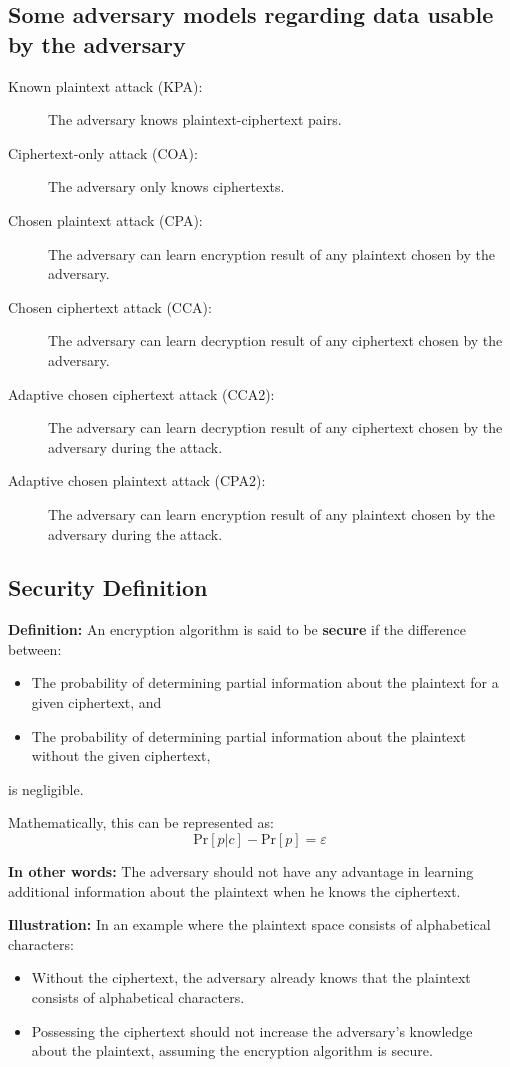 \documentclass[12pt]{article}
\begin{document}
\subsection*{Some adversary models regarding data usable by the adversary}
\begin{description}
    \item[Known plaintext attack (KPA):] The adversary knows plaintext-ciphertext pairs.
    \item[Ciphertext-only attack (COA):] The adversary only knows ciphertexts.
    \item[Chosen plaintext attack (CPA):] The adversary can learn encryption result of any plaintext chosen by the adversary.
    \item[Chosen ciphertext attack (CCA):] The adversary can learn decryption result of any ciphertext chosen by the adversary.
    \item[Adaptive chosen ciphertext attack (CCA2):] The adversary can learn decryption result of any ciphertext chosen by the adversary during the attack.
    \item[Adaptive chosen plaintext attack (CPA2):] The adversary can learn encryption result of any plaintext chosen by the adversary during the attack.     
\end{description}


\subsection*{Security Definition}

\noindent\textbf{Definition:}
An encryption algorithm is said to be \textbf{secure} if the difference between:
\begin{itemize}
    \item The probability of determining partial information about the plaintext for a given ciphertext, and
    \item The probability of determining partial information about the plaintext without the given ciphertext,
\end{itemize}
is negligible.

\noindent Mathematically, this can be represented as:
\[ \text{Pr} [p|c] - \text{Pr}[p] = \varepsilon \]

\noindent\textbf{In other words:}
The adversary should not have any advantage in learning additional information about the plaintext when he knows the ciphertext.

\noindent\textbf{Illustration:}
In an example where the plaintext space consists of alphabetical characters:
\begin{itemize}
    \item Without the ciphertext, the adversary already knows that the plaintext consists of alphabetical characters.
    \item Possessing the ciphertext should not increase the adversary's knowledge about the plaintext, assuming the encryption algorithm is secure.
\end{itemize}
\end{document}
